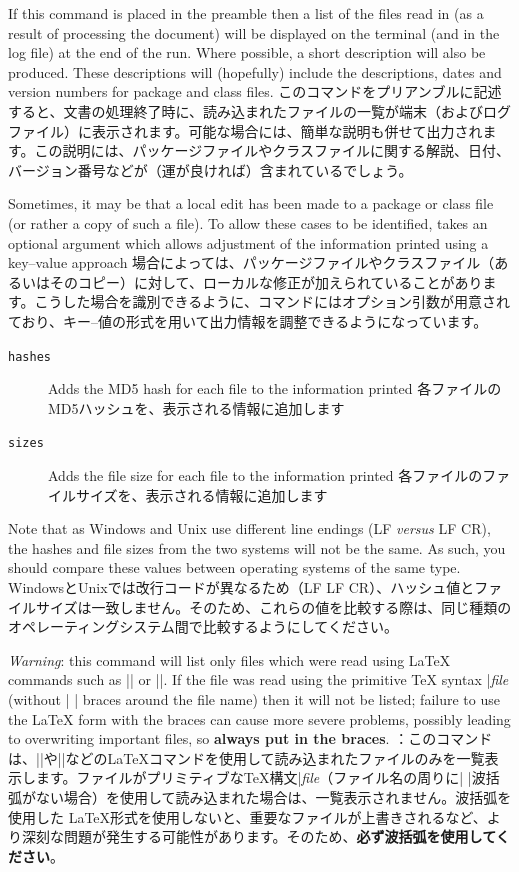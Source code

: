 \documentclass{ltxguide}
\newcommand\jpnewline{\vspace{3pt}\newline}
\DeclareRobustCommand{\jpemph}[1]{%
  \underLine{#1}%
}
\begin{document}
If this command is placed in the preamble then a list of the files
read in (as a result of processing the document) will be displayed
on the terminal (and in the log file) at the end of the run. Where
possible, a short description will also be produced. These descriptions
will (hopefully) include the descriptions, dates and version numbers
for package and class files.
\jpnewline
このコマンドをプリアンブルに記述すると、文書の処理終了時に、読み込まれたファイルの一覧が端末（およびログファイル）に表示されます。可能な場合には、簡単な説明も併せて出力されます。この説明には、パッケージファイルやクラスファイルに関する解説、日付、バージョン番号などが（運が良ければ）含まれているでしょう。

Sometimes, it may be that a local edit has been made to a package or
class file (or rather a copy of such a file). To allow these cases to
be identified,  takes an optional argument which allows
adjustment of the information printed using a key--value approach
\jpnewline
場合によっては、パッケージファイルやクラスファイル（あるいはそのコピー）に対して、ローカルな修正が加えられていることがあります。こうした場合を識別できるように、コマンドにはオプション引数が用意されており、キー--値の形式を用いて出力情報を調整できるようになっています。
\begin{description}
  \item[\texttt{hashes}] Adds the MD5 hash for each file to the
    information printed
    \jpnewline
    各ファイルのMD5ハッシュを、表示される情報に追加します
  \item[\texttt{sizes}] Adds the file size for each file to the
    information printed
    \jpnewline
    各ファイルのファイルサイズを、表示される情報に追加します
\end{description}
Note that as Windows and Unix use different line endings (LF \emph{versus} LF
CR), the hashes and file sizes from the two systems will not be the same. As
such, you should compare these values between operating systems of the same
type.
\jpnewline
WindowsとUnixでは改行コードが異なるため（LF \jpemph{に対して}LF CR）、ハッシュ値とファイルサイズは一致しません。そのため、これらの値を比較する際は、同じ種類のオペレーティングシステム間で比較するようにしてください。

\emph{Warning}: this command will list only files which were read
using \LaTeX{} commands such as || or
||.  If the file was read using the primitive \TeX{}
syntax |\emph{file} (without |{ }| braces around the file name)
then it will not be listed; failure to use the \LaTeX{} form with the
braces can cause more severe problems, possibly leading to overwriting
important files, so \textbf{always put in the braces}.
\jpnewline
\jpemph{警告}：このコマンドは、||や||などの\LaTeX{}コマンドを使用して読み込まれたファイルのみを一覧表示します。ファイルがプリミティブな\TeX{}構文|\emph{file}（ファイル名の周りに|{ }|波括弧がない場合）を使用して読み込まれた場合は、一覧表示されません。波括弧を使用した \LaTeX{}形式を使用しないと、重要なファイルが上書きされるなど、より深刻な問題が発生する可能性があります。そのため、\textbf{必ず波括弧を使用してください}。
\end{document}
